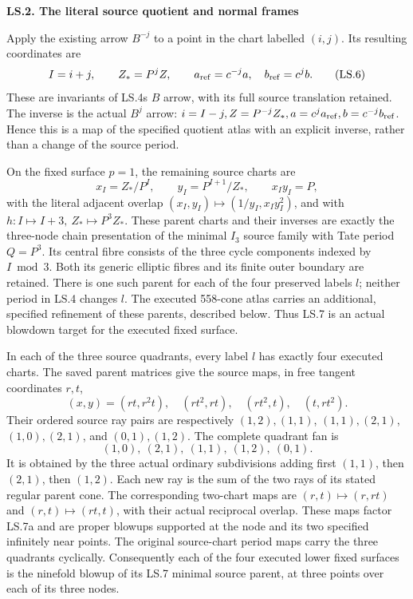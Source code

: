 \par

\medskip\noindent\textbf{LS.2. The literal source quotient and normal frames}

\par\nobreak

Apply the existing arrow \(B^{-j}\) to a point in the chart
labelled \((i,j)\). Its resulting coordinates are
\[
 I=i+j,\qquad Z_*=P^jZ,\qquad
 a_{\rm ref}=c^{-j}a,\quad b_{\rm ref}=c^j b.
 \tag{LS.6}
\]
These are invariants of LS.4\textquotesingle s \(B\) arrow, with its full
source translation retained. The inverse is the actual
\(B^j\) arrow:
\(i=I-j, Z=P^{-j}Z_*,a=c^j a_{\rm ref},b=c^{-j}b_{\rm ref}\).
Hence this is a map of the specified quotient atlas with an
explicit inverse, rather than a change of the source period.

On the fixed surface \(p=1\), the remaining source charts are
\[
 x_I=Z_*/P^I,\qquad y_I=P^{I+1}/Z_*,\qquad
 x_Iy_I=P,
 \tag{LS.7}
\]
with the literal adjacent overlap
\((x_I,y_I)\mapsto(1/y_I,x_Iy_I^2)\), and with
\(h:I\mapsto I+3,\ Z_*\mapsto P^3Z_*\).
These parent charts and their inverses are exactly the three-node
chain presentation of the minimal \(I_3\) source family with
Tate period \(Q=P^3\). Its central fibre consists of the three
cycle components indexed by \(I\bmod3\). Both its generic
elliptic fibres and its finite outer boundary are retained.
There is one such parent for each of the four preserved labels
\(l\); neither period in LS.4 changes \(l\). The executed
558-cone atlas carries an additional, specified refinement of
these parents, described below. Thus LS.7 is an actual
blowdown target for the executed fixed surface.

In each of the three source quadrants, every label \(l\)
has exactly four executed charts. The saved parent matrices
give the source maps, in free tangent coordinates \(r,t\),
\[
 (x,y)=(rt,r^2t),\quad(rt^2,rt),\quad(rt^2,t),
 \quad(t,rt^2).
 \tag{LS.7a}
\]
Their ordered source ray pairs are respectively
\((1,2),(1,1)\), \((1,1),(2,1)\),
\((1,0),(2,1)\), and \((0,1),(1,2)\).
The complete quadrant fan is
\[
 (1,0),\ (2,1),\ (1,1),\ (1,2),\ (0,1).
 \tag{LS.7b}
\]
It is obtained by the three actual ordinary subdivisions
adding first \((1,1)\), then \((2,1)\), then \((1,2)\).
Each new ray is the sum of the two rays of its stated
regular parent cone. The corresponding two-chart maps
are \((r,t)\mapsto(r,rt)\) and
\((r,t)\mapsto(rt,t)\), with their actual reciprocal
overlap. These maps factor LS.7a and are proper blowups
supported at the node and its two specified infinitely
near points. The original source-chart period maps carry
the three quadrants cyclically. Consequently each of the
four executed lower fixed surfaces is the ninefold
blowup of its LS.7 minimal source parent, at three
points over each of its three nodes.


